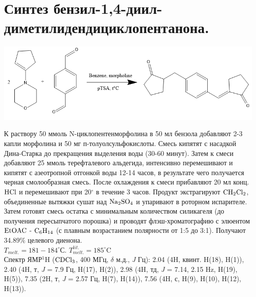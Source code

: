 \documentclass[a4paper]{article}
\begin{document}
\section{Синтез бензил-1,4-диил-диметилидендициклопентанона.}
\begin{center}
\includegraphics[scale=0.45]{pictures/4.png}
\end{center}
К раствору 50 ммоль N-циклопентенморфолина в 50 мл бензола добавляют 2-3 капли морфолина и 50 мг п-толуолсульфокислоты. Смесь кипятят с насадкой Дина-Старка до прекращения выделения воды (30-60 минут). Затем к смеси добавляют 25 ммоль терефталевого альдегида, интенсивно перемешивают и кипятят с азеотропной отгонкой воды 12-14 часов, в результате чего получается черная смолообразная смесь. После охлаждения к смеси прибавляют 20 мл конц. $\ce{HCl}$ и перемешивают при 20$^{\circ}$ в течение 3 часов. Продукт экстрагируют $\ce{CH2Cl2}$, объединенные вытяжки сушат над $\ce{Na2SO4}$ и упаривают в роторном испарителе. Затем готовят смесь остатка с минимальным количеством силикагеля (до получения пересыпчатого порошка) и проводят флэш-хроматографию с элюентом $\ce{EtOAC}$ - $\ce{C6H14}$ (с плавным возрастанием полярности от 1:5 до 3:1). Получают 34.89$\%$ целевого диенона. \\ 
$T_{melt.} = 181-184^{\circ}$С. $T_{melt.}^{lit.} = 185^{\circ}$C \cite{dimmock2002} \\
Спектр ЯМР$^{1}$H ($\ce{CDCl3}$, 400 МГц, $\delta$ м.д., \textit{J} Гц): 2.04 (4H, квинт. H(18), H(1)), 2.40 (4H, т, \textit{J} = 7.9 Гц, H(17), H(2)), 2.98 (4H, тд, \textit{J} = 7.14, 2.15 Hz, H(19), H(5)), 7.35 (2H, т, \textit{J} = 2.57 Гц, H(7), H(14)), 7.56 (4H, с, H(9), H(10), H(12), H(13)).



\end{document}
